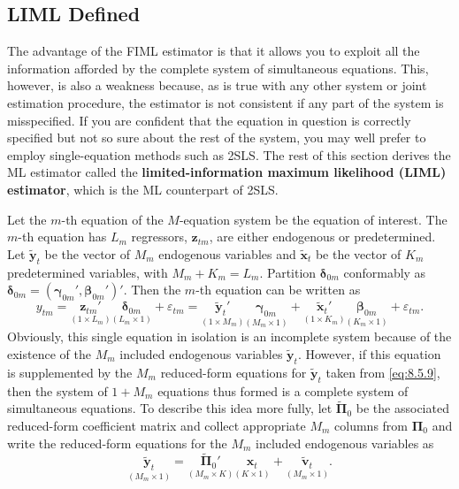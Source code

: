
\subsection*{LIML Defined}

The advantage of the FIML estimator is that it allows you to exploit all the information afforded by the complete system of simultaneous equations. This, however,
is also a weakness because, as is true with any other system or joint estimation procedure, the estimator is not consistent if any part of the system is misspecified.
If you are confident that the equation in question is correctly specified but not so
sure about the rest of the system, you may well prefer to employ single-equation
methods such as 2SLS. The rest of this section derives the ML estimator called the
\textbf{limited-information maximum likelihood (LIML) estimator}, which is the ML
counterpart of 2SLS.

Let the $m$-th equation of the $M$-equation system be the equation of interest. The
$m$-th equation has $L_m$ regressors, $\mathbf{z}_{tm}$, are either endogenous or predetermined. Let
$\tilde{\mathbf{y}}_t$ be the vector
of $M_m$ endogenous variables and $\tilde{\mathbf{x}}_t$ be the vector of $K_m$ predetermined variables,
with $M_m + K_m = L_m$. Partition $\boldsymbol{\delta}_{0m}$ conformably as
$\boldsymbol{\delta}_{0m} = (\boldsymbol{\gamma}_{0m}', \boldsymbol{\beta}_{0m}')'$. Then the
$m$-th equation can be written as
\begin{equation}
  y_{tm} = \underset{(1 \times L_m)}{\mathbf{z}_{tm}'}
  \underset{(L_m \times 1)}{\boldsymbol{\delta}_{0m}}
  + \varepsilon_{tm}
  = \underset{(1 \times M_m)}{\tilde{\mathbf{y}}_t'}
  \underset{(M_m \times 1)}{\boldsymbol{\gamma}_{0m}}
  + \underset{(1 \times K_m)}{\tilde{\mathbf{x}}_t'}
  \underset{(K_m \times 1)}{\boldsymbol{\beta}_{0m}}
  + \varepsilon_{tm}.
  \label{eq:8.6.1} \tag{8.6.1}
\end{equation}
Obviously, this single equation in isolation is an incomplete system because of the
existence of the $M_m$ included endogenous variables $\tilde{\mathbf{y}}_t$. However, if this equation
is supplemented by the $M_m$ reduced-form equations for $\tilde{\mathbf{y}}_t$ taken from \eqref{eq:8.5.9}, then
the system of $1 + M_m$ equations thus formed is a complete system of simultaneous
equations. To describe this idea more fully, let $\tilde{\boldsymbol{\Pi}}_0$ be the associated reduced-form coefficient matrix and collect appropriate $M_m$ columns from $\boldsymbol{\Pi}_0$ and write the
reduced-form equations for the $M_m$ included endogenous variables as
\begin{equation}
  \underset{(M_m \times 1)}{\tilde{\mathbf{y}}_t}
  = \underset{(M_m \times K)}{\tilde{\boldsymbol{\Pi}}_0'}
  \underset{(K \times 1)}{\mathbf{x}_t}
  + \underset{(M_m \times 1)}{\tilde{\mathbf{v}}_t}.
  \label{eq:8.6.2} \tag{8.6.2}
\end{equation}

